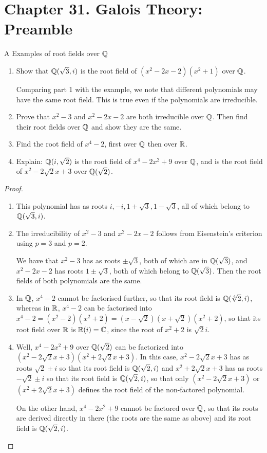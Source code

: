 \section*{Chapter 31. Galois Theory: Preamble}


\begin{exercise}{A Examples of root fields over $\mathbb{Q}$}
\begin{enumerate}
    \item Show that $\mathbb{Q}(\sqrt{3},i)$ is the root field of $(x^2-2x-2)(x^2+1)$ over $\mathbb{Q}$.

    Comparing part 1 with the example, we note that different polynomials may have the same root field. This is true even if the polynomials are irreducible.
    \item Prove that $x^2-3$ and $x^2-2x-2$ are both irreducible over $\mathbb{Q}$. Then find their root fields over $\mathbb{Q}$ and show they are the same.
    \item Find the root field of $x^4-2$, first over $\mathbb{Q}$ then over $\mathbb{R}$.
    \item Explain: $\mathbb{Q}(i,\sqrt{2})$ is the root field of $x^4-2x^2+9$ over $\mathbb{Q}$, and is the root field of $x^2-2\sqrt{2}x+3$ over $\mathbb{Q}(\sqrt{2})$.
\end{enumerate}
\end{exercise}
\begin{proof}
 \begin{enumerate}
     \item This polynomial has as roots $i, -i, 1+\sqrt{3}, 1-\sqrt{3}$, all of which belong to $\mathbb{Q}(\sqrt{3}, i)$.
     \item The irreducibility of $x^2-3$ and $x^2-2x-2$ follows from Eisenstein's criterion using $p=3$ and $p=2$.

     We have that $x^2-3$ has as roots $\pm\sqrt{3}$, both of which are in $\mathbb{Q}(\sqrt{3})$, and $x^2-2x-2$ has roots $1\pm\sqrt{3}$, both of which belong to $\mathbb{Q}(\sqrt{3})$. Then the root fields of both polynomials are the same.
     \item In $\mathbb{Q}$, $x^4-2$ cannot be factorised further, so that its root field is $\mathbb{Q}(\sqrt[4]{2},i)$, whereas in $\mathbb{R}$, $x^4-2$ can be factorised into $x^4-2=(x^2-2)(x^2+2)=(x-\sqrt{2})(x+\sqrt{2})(x^2+2)$, so that its root field over $\mathbb{R}$ is $\mathbb{R}(i)=\mathbb{C}$, since the root of $x^2+2$ is $\sqrt{2}i$.
     \item Well, $x^4-2x^2+9$ over $\mathbb{Q}(\sqrt{2})$ can be factorized into $(x^2-2\sqrt{2}x+3)(x^2+2\sqrt{2}x+3)$. In this case, $x^2-2\sqrt{2}x+3$ has as roots $\sqrt{2}\pm i$ so that its root field is $\mathbb{Q}(\sqrt{2}, i)$ and $x^2+2\sqrt{2}x+3$ has as roots $-\sqrt{2}\pm i$ so that its root field is $\mathbb{Q}(\sqrt{2},i)$, so that only $(x^2-2\sqrt{2}x+3)$ or $(x^2+2\sqrt{2}x+3)$ defines the root field of the non-factored polynomial. 

     On the other hand, $x^4-2x^2+9$ cannot be factored over $\mathbb{Q}$, so that its roots are derived directly in there (the roots are the same as above) and its root field is $\mathbb{Q}(\sqrt{2},i)$.
 \end{enumerate}
\end{proof}


